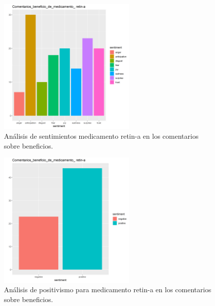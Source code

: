 \documentclass[spanish,]{article}
\begin{document}
\begin{figure}[h]
    \centering
    \includegraphics[width=0.6\textwidth]{figuras/sentimientos/Aretin1.png}
    \caption{Análisis de sentimientos medicamento retin-a en los comentarios sobre beneficios.}
    \label{fig:sentimientos:40}
\end{figure}

\begin{figure}[h]
    \centering
    \includegraphics[width=0.6\textwidth]{figuras/sentimientos/Aretin2.png}
    \caption{Análisis de positivismo para medicamento retin-a en los comentarios sobre beneficios.}
    \label{fig:sentimientos:41}
\end{figure}
\end{document}
